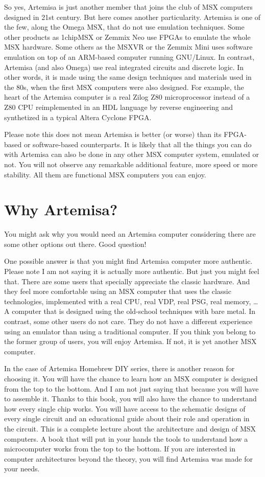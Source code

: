 So yes, Artemisa is just another member that joins the club of MSX computers designed in 21st century. But here comes another particularity. Artemisa is one of the few, along the Omega MSX, that do not use emulation techniques. Some other products as 1chipMSX or Zemmix Neo use FPGAs to emulate the whole MSX hardware. Some others as the MSXVR or the Zemmix Mini uses software emulation on top of an ARM-based computer running GNU/Linux. In contrast, Artemisa (and also Omega) use real integrated circuits and discrete logic. In other words, it is made using the same design techniques and materials used in the 80s, when the first MSX computers were also designed. For example, the heart of the Artemisa computer is a real Zilog Z80 microprocessor instead of a Z80 CPU reimplemented in an HDL language by reverse engineering and synthetized in a typical Altera Cyclone FPGA.

Please note this does not mean Artemisa is better (or worse) than its FPGA-based or software-based counterparts. It is likely that all the things you can do with Artemisa can also be done in any other MSX computer system, emulated or not. You will not observe any remarkable additional feature, more speed or more stability. All them are functional MSX computers you can enjoy.

\section{Why Artemisa?}

You might ask why you would need an Artemisa computer considering there are some other options out there. Good question!

One possible answer is that you might find Artemisa computer more authentic. Please note I am not saying it is actually more authentic. But just you might feel that. There are some users that specially appreciate the classic hardware. And they feel more comfortable using an MSX computer that uses the classic technologies, implemented with a real CPU, real VDP, real PSG, real memory, … A computer that is designed using the old-school techniques with bare metal. In contrast, some other users do not care. They do not have a different experience using an emulator than using a traditional computer. If you think you belong to the former group of users, you will enjoy Artemisa. If not, it is yet another MSX computer.

In the case of Artemisa Homebrew DIY series, there is another reason for choosing it. You will have the chance to learn how an MSX computer is designed from the top to the bottom. And I am not just saying that because you will have to assemble it. Thanks to this book, you will also have the chance to understand how every single chip works. You will have access to the schematic designs of every single circuit and an educational guide about their role and operation in the circuit. This is a complete lecture about the architecture and design of MSX computers. A book that will put in your hands the tools to understand how a microcomputer works from the top to the bottom. If you are interested in computer architectures beyond the theory, you will find Artemisa was made for your needs. 

